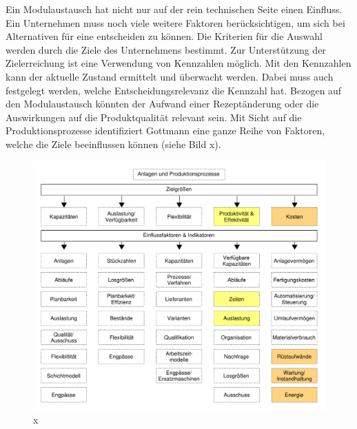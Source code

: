 Ein Modulaustausch hat nicht nur auf der rein technischen Seite einen Einfluss. Ein Unternehmen muss noch viele weitere Faktoren berücksichtigen, um sich bei Alternativen für eine entscheiden zu können. Die Kriterien für die Auswahl werden durch die Ziele des Unternehmens bestimmt. Zur Unterstützung der Zielerreichung ist eine Verwendung von Kennzahlen möglich. Mit den Kennzahlen kann der aktuelle Zustand ermittelt und überwacht werden. Dabei muss auch festgelegt werden, welche Entscheidungsrelevanz die Kennzahl hat.  Bezogen auf den Modulaustausch könnten der Aufwand einer Rezeptänderung oder die Auswirkungen auf die Produktqualität relevant sein. Mit Sicht auf die Produktionsprozesse identifiziert Gottmann \cite{Gottmann2016} eine ganze Reihe von Faktoren, welche die Ziele beeinflussen können (siehe Bild x).
\begin{figure}[htb]
\centering
\includegraphics[scale=0.5]{DA_files/Bilder/Analyse/Produktionsprozesse-Zielgroessen.pdf}
\caption{x}
\label{pic:Produktionsprozesse-Zielgroessen}
\end{figure}

